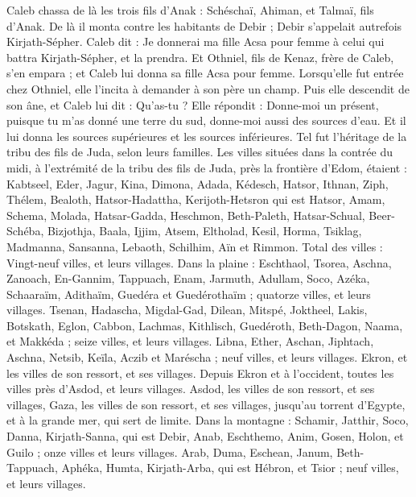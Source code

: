 \begin{multicols}{2}
Caleb chassa de là les trois fils d’Anak : Schéschaï, Ahiman, et Talmaï, fils d’Anak.
De là il monta contre les habitants de Debir ; Debir s’appelait autrefois Kirjath-Sépher.
Caleb dit : Je donnerai ma fille Acsa pour femme à celui qui battra Kirjath-Sépher, et la prendra.
Et Othniel, fils de Kenaz, frère de Caleb, s’en empara ; et Caleb lui donna sa fille Acsa pour femme.
Lorsqu’elle fut entrée chez Othniel, elle l’incita à demander à son père un champ. Puis elle descendit de son âne, et Caleb lui dit : Qu’as-tu ?
Elle répondit : Donne-moi un présent, puisque tu m’as donné une terre du sud, donne-moi aussi des sources d’eau. Et il lui donna les sources supérieures et les sources inférieures.
Tel fut l’héritage de la tribu des fils de Juda, selon leurs familles.
Les villes situées dans la contrée du midi, à l’extrémité de la tribu des fils de Juda, près la frontière d’Edom, étaient : Kabtseel, Eder, Jagur,
Kina, Dimona, Adada,
Kédesch, Hatsor, Ithnan,
Ziph, Thélem, Bealoth,
Hatsor-Hadattha, Kerijoth-Hetsron qui est Hatsor,
Amam, Schema, Molada,
Hatsar-Gadda, Heschmon, Beth-Paleth,
Hatsar-Schual, Beer-Schéba, Bizjothja,
Baala, Ijjim, Atsem,
Eltholad, Kesil, Horma,
Tsiklag, Madmanna, Sansanna,
Lebaoth, Schilhim, Aïn et Rimmon. Total des villes : Vingt-neuf villes, et leurs villages.
Dans la plaine : Eschthaol, Tsorea, Aschna,
Zanoach, En-Gannim, Tappuach, Enam,
Jarmuth, Adullam, Soco, Azéka,
Schaaraïm, Adithaïm, Guedéra et Guedérothaïm ; quatorze villes, et leurs villages.
Tsenan, Hadascha, Migdal-Gad,
Dilean, Mitspé, Joktheel,
Lakis, Botskath, Eglon,
Cabbon, Lachmas, Kithlisch,
Guedéroth, Beth-Dagon, Naama, et Makkéda ; seize villes, et leurs villages.
Libna, Ether, Aschan,
Jiphtach, Aschna, Netsib,
Keïla, Aczib et Maréscha ; neuf villes, et leurs villages.
Ekron, et les villes de son ressort, et ses villages.
Depuis Ekron et à l’occident, toutes les villes près d’Asdod, et leurs villages.
Asdod, les villes de son ressort, et ses villages, Gaza, les villes de son ressort, et ses villages, jusqu’au torrent d’Egypte, et à la grande mer, qui sert de limite.
Dans la montagne : Schamir, Jatthir, Soco,
Danna, Kirjath-Sanna, qui est Debir,
Anab, Eschthemo, Anim,
Gosen, Holon, et Guilo ; onze villes et leurs villages.
Arab, Duma, Eschean,
Janum, Beth-Tappuach, Aphéka,
Humta, Kirjath-Arba, qui est Hébron, et Tsior ; neuf villes, et leurs villages.

\end{multicols}
